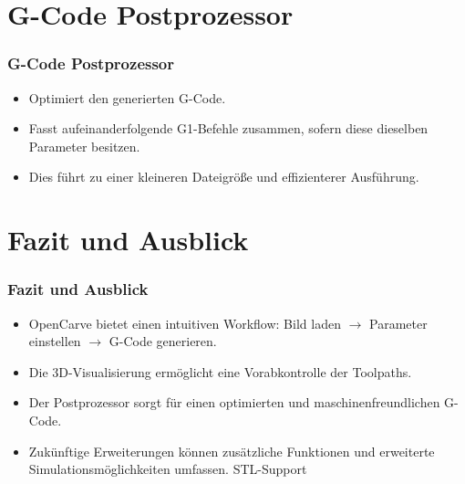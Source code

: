 \documentclass[14pt, aspectratio=169]{beamer}
\begin{document}
\section{G-Code Postprozessor}
\begin{frame}
  \frametitle{G-Code Postprozessor}
  \begin{itemize}
    \item Optimiert den generierten G-Code.
    \item Fasst aufeinanderfolgende G1-Befehle zusammen, sofern diese dieselben Parameter besitzen.
    \item Dies führt zu einer kleineren Dateigröße und effizienterer Ausführung.
  \end{itemize}
\end{frame}

\section{Fazit und Ausblick}
\begin{frame}
  \frametitle{Fazit und Ausblick}
  \begin{itemize}
    \item OpenCarve bietet einen intuitiven Workflow: Bild laden $\rightarrow$ Parameter einstellen $\rightarrow$ G-Code generieren.
    \item Die 3D-Visualisierung ermöglicht eine Vorabkontrolle der Toolpaths.
    \item Der Postprozessor sorgt für einen optimierten und maschinenfreundlichen G-Code.
    \item Zukünftige Erweiterungen können zusätzliche Funktionen und erweiterte Simulationsmöglichkeiten umfassen. STL-Support
  \end{itemize}
\end{frame}
\end{document}
